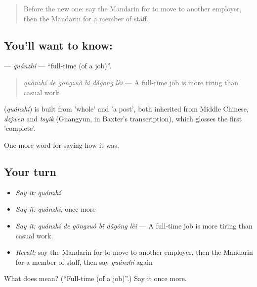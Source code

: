 \label{lesson:ZH-C489-quanzhi}



\begin{quote}
Before the new one: say the Mandarin for to move to another employer, then the Mandarin for a member of staff.
\end{quote}

\subsection*{You'll want to know: }
\textbf{} — \emph{quánzhí} — \textquotedblleft{}full-time (of a job)\textquotedblright{}.

\begin{quote}
\emph{quánzhí de gōngzuò bǐ dǎgōng lèi} — A full-time job is more tiring than casual work.
\end{quote}

\begin{cousinweb}
\textbf{} (\emph{quánzhí}) is built from  'whole' and  'a post', both inherited from Middle Chinese, \emph{dzjwen} and \emph{tsyik} (Guangyun, in Baxter's transcription), which glosses the first 'complete'.
\end{cousinweb}

\begin{grammarlens}[title={What you've built}]
One more word for saying how it was.
\end{grammarlens}

\subsection*{Your turn}
\begin{itemize}
\raggedright
  \item \emph{Say it:} \emph{quánzhí}
  \item \emph{Say it:} \emph{quánzhí}, once more
  \item \emph{Say it:} \emph{quánzhí de gōngzuò bǐ dǎgōng lèi} — A full-time job is more tiring than casual work.
  \item \emph{Recall:} say the Mandarin for to move to another employer, then the Mandarin for a member of staff, then say \emph{quánzhí} again
\end{itemize}

\begin{tcolorbox}[breakable,colback=teal!4,colframe=teal!35!black,title={Before you move on}]
What does  mean? (\textquotedblleft{}Full-time (of a job)\textquotedblright{}.) Say it once more.
\end{tcolorbox}
